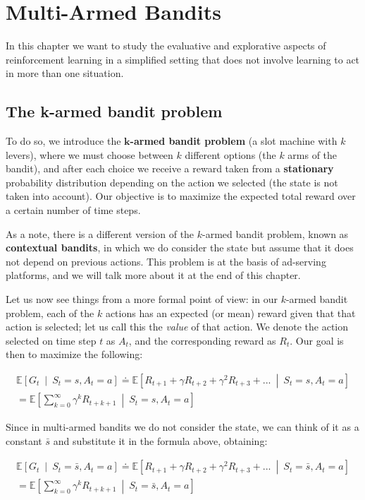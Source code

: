 \chapter{Multi-Armed Bandits}
In this chapter we want to study the evaluative and explorative aspects of reinforcement learning in a simplified setting that does not involve learning to act in more than one situation.

\section{The k-armed bandit problem}
To do so, we introduce the \textbf{$\boldsymbol{k}$-armed bandit problem} (a slot machine with $k$ levers), where we must choose between $k$ different options (the $k$ arms of the bandit), and after each choice we receive a reward taken from a \textbf{stationary} probability distribution depending on the action we selected (the state is not taken into account). Our objective is to maximize the expected total reward over a certain number of time steps.

As a note, there is a different version of the $k$-armed bandit problem, known as \textbf{contextual bandits}, in which we do consider the state but assume that it does not depend on previous actions. This problem is at the basis of ad-serving platforms, and we will talk more about it at the end of this chapter.

Let us now see things from a more formal point of view: in our $k$-armed bandit problem, each of the $k$ actions has an expected (or mean) reward given that that action is selected; let us call this the \textit{value} of that action. We denote the action selected on time step $t$ as $A_t$, and the corresponding reward as $R_t$. Our goal is then to maximize the following:

\begin{gather*}
    \mathbb{E} \left[ G_t \  \middle\vert \  S_t = s, A_t = a \right] \doteq \mathbb{E} \left[ R_{t+1} + \gamma R_{t+2} + \gamma^2 R_{t+3} + ... \  \middle\vert \  S_t = s, A_t = a \right] \\
    = \mathbb{E} \left[ \sum_{k=0}^{\infty} \gamma^k R_{t+k+1} \  \middle\vert \  S_t = s, A_t = a \right]
\end{gather*}

Since in multi-armed bandits we do not consider the state, we can think of it as a constant $\bar{s}$ and substitute it in the formula above, obtaining:

\begin{gather*}
    \mathbb{E} \left[ G_t \  \middle\vert \  S_t = \bar{s}, A_t = a \right] \doteq \mathbb{E} \left[ R_{t+1} + \gamma R_{t+2} + \gamma^2 R_{t+3} + ... \  \middle\vert \  S_t = \bar{s}, A_t = a \right] \\
    = \mathbb{E} \left[ \sum_{k=0}^{\infty} \gamma^k R_{t+k+1} \  \middle\vert \  S_t = \bar{s}, A_t = a \right]
\end{gather*}

